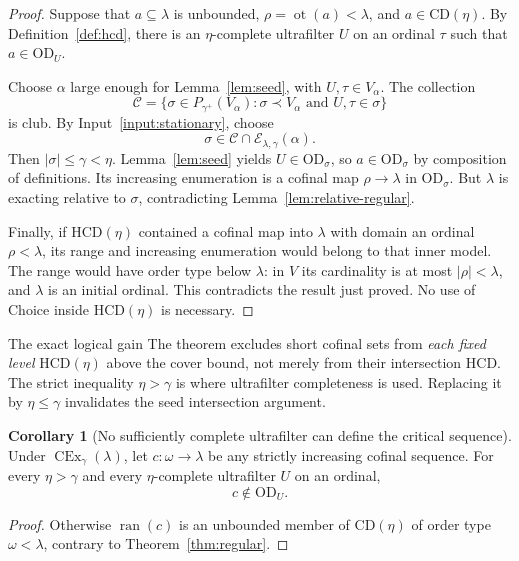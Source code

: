 \documentclass[11pt,letterpaper]{article}
\theoremstyle{definition}
\newtheorem{corollary}[definition]{Corollary}
\newcommand{\OD}{\mathrm{OD}}
\newcommand{\CEx}{\operatorname{CEx}}
\newcommand{\ot}{\operatorname{ot}}
\newcommand{\HCD}{\mathrm{HCD}}
\newcommand{\CD}{\mathrm{CD}}
\newcommand{\ran}{\operatorname{ran}}
\newcommand{\Cex}[2]{\CEx_{#1}(#2)}
\theoremstyle{remark}
\begin{document}
\begin{proof}
Suppose that $a\subseteq\lambda$ is unbounded, $\rho=\ot(a)<\lambda$, and $a\in\CD(\eta)$. By Definition~\ref{def:hcd}, there is an $\eta$-complete ultrafilter $U$ on an ordinal $\tau$ such that $a\in\OD_U$.

Choose $\alpha$ large enough for Lemma~\ref{lem:seed}, with $U,\tau\in V_\alpha$. The collection
\[
 \mathcal C=\{\sigma\in P_{\gamma^+}(V_\alpha):
                      \sigma\prec V_\alpha\text{ and }U,\tau\in\sigma\}
\]
is club. By Input~\ref{input:stationary}, choose
\[
 \sigma\in\mathcal C\cap\mathcal E_{\lambda,\gamma}(\alpha).
\]
Then $|\sigma|\leq\gamma<\eta$. Lemma~\ref{lem:seed} yields $U\in\OD_\sigma$, so $a\in\OD_\sigma$ by composition of definitions. Its increasing enumeration is a cofinal map $\rho\to\lambda$ in $\OD_\sigma$. But $\lambda$ is exacting relative to $\sigma$, contradicting Lemma~\ref{lem:relative-regular}.

Finally, if $\HCD(\eta)$ contained a cofinal map into $\lambda$ with domain an ordinal $\rho<\lambda$, its range and increasing enumeration would belong to that inner model. The range would have order type below $\lambda$: in $V$ its cardinality is at most $|\rho|<\lambda$, and $\lambda$ is an initial ordinal. This contradicts the result just proved. No use of Choice inside $\HCD(\eta)$ is necessary.
\end{proof}

\begin{assessment}{The exact logical gain}
The theorem excludes short cofinal sets from \emph{each fixed level} $\HCD(\eta)$ above the cover bound, not merely from their intersection $\HCD$. The strict inequality $\eta>\gamma$ is where ultrafilter completeness is used. Replacing it by $\eta\leq\gamma$ invalidates the seed intersection argument.
\end{assessment}

\begin{corollary}[No sufficiently complete ultrafilter can define the critical sequence]\label{cor:sequence}
Under $\Cex{\gamma}{\lambda}$, let $c:\omega\to\lambda$ be any strictly increasing cofinal sequence. For every $\eta>\gamma$ and every $\eta$-complete ultrafilter $U$ on an ordinal,
\[
 c\notin\OD_U.
\]
\end{corollary}

\begin{proof}
Otherwise $\ran(c)$ is an unbounded member of $\CD(\eta)$ of order type $\omega<\lambda$, contrary to Theorem~\ref{thm:regular}.
\end{proof}
\end{document}
